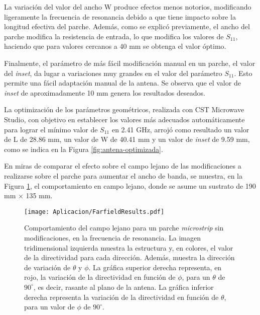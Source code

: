 La variación del valor del ancho W produce efectos menos notorios, modificando ligeramente la frecuencia de resonancia debido a que tiene impacto sobre la longitud efectiva del parche. Además, como se explicó previamente, el ancho del parche modifica la resistencia de entrada, lo que modifica  los valores de $S_{11}$, haciendo que para valores cercanos a 40 mm se obtenga el valor óptimo.

Finalmente, el parámetro de más fácil modificación manual en un parche, el valor del \textit{inset}, da lugar a variaciones muy grandes en el valor del parámetro $S_{11}$. Esto permite una fácil adaptación manual de la antena. Se observa que el valor de \textit{inset} de aproximadamente 10 mm genera los resultados deseados.

La optimización de los parámetros geométricos, realizada con CST Microwave Studio, con objetivo en establecer los valores más adecuados automáticamente para lograr el mínimo valor de $S_{11}$ en 2.41 GHz, arrojó como resultado un valor de L de 28.86 mm, un valor de W de 40.41 mm y un valor de \textit{inset} de 9.59 mm, como se indica en la Figura \ref{fig:antena-optimizada}.

En miras de comparar el efecto sobre el campo lejano de las modificaciones a realizarse sobre el parche para aumentar el ancho de banda, se muestra, en la Figura \ref{fig:farfield-1parche-sincarga-sinebg}, el comportamiento en campo lejano, donde se asume un sustrato de 190 mm $\times$ 135 mm.

\begin{figure}[h]
	\centering
	\texttt{[image: Aplicacion/FarfieldResults.pdf]}
	\caption{Comportamiento del campo lejano para un parche \textit{microstrip} sin modificaciones, en la frecuencia de resonancia. La imagen tridimensional izquierda muestra la estructura y, en colores, el valor de la directividad para cada dirección. Además, muestra la dirección de variación de $\theta$ y $\phi$. La gráfica superior derecha representa, en rojo, la variación de la directividad en función de $\phi$, para un $\theta$ de $90^{\circ}$, es decir, rasante al plano de la antena. La gráfica inferior derecha representa la variación de la directividad en función de $\theta$, para un valor de $\phi$ de $90^{\circ}$.}
	\label{fig:farfield-1parche-sincarga-sinebg}
\end{figure}



